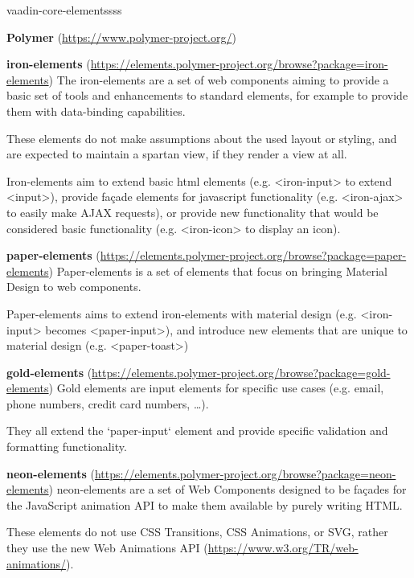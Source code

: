 \begin{labeling}{vaadin-core-elementssss}
\item [\textbf{Polymer}] (\url{https://www.polymer-project.org/})
\item [\textbf{iron-elements}] (\url{https://elements.polymer-project.org/browse?package=iron-elements})
The iron-elements are a set of web components aiming to provide a basic set of
tools and enhancements to standard elements, for example to provide them with
data-binding capabilities.

These elements do not make assumptions about the used layout or styling, and are
expected to maintain a spartan view, if they render a view at all.

Iron-elements aim to extend basic html elements (e.g. <iron-input> to extend
<input>), provide façade elements for javascript functionality (e.g. <iron-ajax>
to easily make AJAX requests), or provide new functionality that would be
considered basic functionality (e.g. <iron-icon> to display an icon).
\item [\textbf{paper-elements}] (\url{https://elements.polymer-project.org/browse?package=paper-elements})
Paper-elements is a set of elements that focus on bringing Material Design\cite{materialdesign}
to web components.

Paper-elements aims to extend iron-elements with material design (e.g. <iron-input>
becomes <paper-input>), and introduce new elements that are unique to material
design (e.g. <paper-toast>)
\item [\textbf{gold-elements}] (\url{https://elements.polymer-project.org/browse?package=gold-elements})
Gold elements are input elements for specific use cases (e.g. email, phone numbers,
credit card numbers, \ldots).

They all extend the `paper-input` element and provide specific validation and
formatting functionality.
\item [\textbf{neon-elements}] (\url{https://elements.polymer-project.org/browse?package=neon-elements})
neon-elements are a set of Web Components designed to be façades for the
JavaScript animation API to make them available by purely writing HTML.

These elements do not use CSS Transitions, CSS Animations, or SVG, rather they
use the new Web Animations API (\url{https://www.w3.org/TR/web-animations/}).


\end{labeling}
